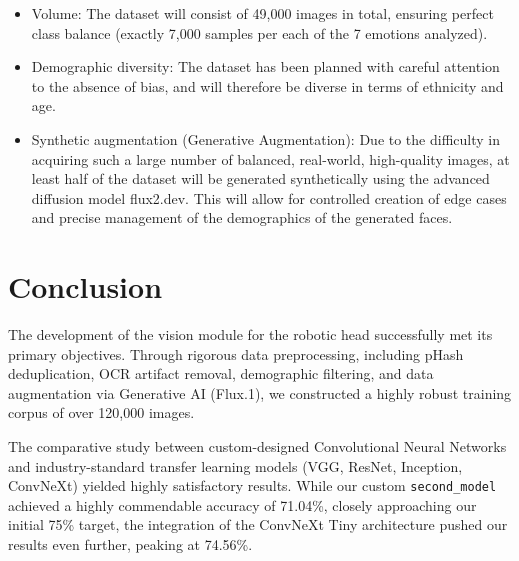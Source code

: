 \documentclass{article}
\begin{document}
\begin{itemize}
    \item Volume: The dataset will consist of 49,000 images in total, ensuring perfect class balance (exactly 7,000 samples per each of the 7 emotions analyzed).
    \item Demographic diversity: The dataset has been planned with careful attention to the absence of bias, and will therefore be diverse in terms of ethnicity and age.
    \item Synthetic augmentation (Generative Augmentation): Due to the difficulty in acquiring such a large number of balanced, real-world, high-quality images, at least half of the dataset will be generated synthetically using the advanced diffusion model flux2.dev. This will allow for controlled creation of edge cases and precise management of the demographics of the generated faces.
\end{itemize}

\section{Conclusion}
The development of the vision module for the robotic head successfully met its primary objectives. Through rigorous data preprocessing, including pHash deduplication, OCR artifact removal, demographic filtering, and data augmentation via Generative AI (Flux.1), we constructed a highly robust training corpus of over 120,000 images.

The comparative study between custom-designed Convolutional Neural Networks and industry-standard transfer learning models (VGG, ResNet, Inception, ConvNeXt) yielded highly satisfactory results. While our custom \texttt{second\_model} achieved a highly commendable accuracy of 71.04\%, closely approaching our initial 75\% target, the integration of the ConvNeXt Tiny architecture pushed our results even further, peaking at 74.56\%.
\end{document}
